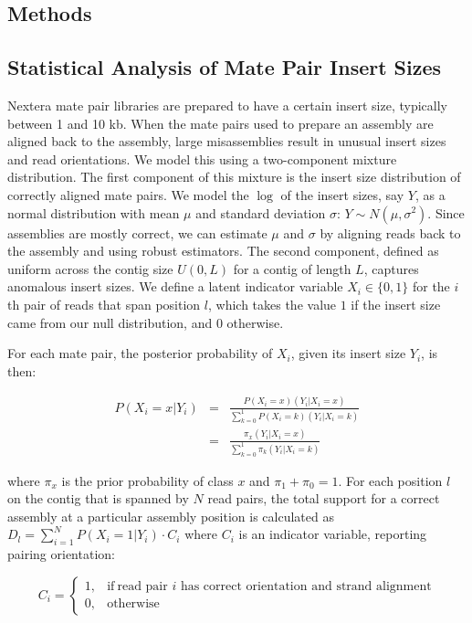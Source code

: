 \documentclass{bioinfo}
\begin{document}
\begin{methods}
\section{Methods}
\subsection{Statistical Analysis of Mate Pair Insert Sizes}
Nextera mate pair libraries are prepared to have a certain insert size, typically between 1 and 10 kb. When the mate pairs used to prepare an assembly are aligned back to the assembly, large misassemblies result in unusual insert sizes and read orientations. We model this using a two-component mixture distribution. The first component of this mixture is the insert size distribution of correctly aligned mate pairs.  We model the $\log$ of the insert sizes, say $Y$, as a normal distribution with mean $\mu$ and standard deviation $\sigma$: $Y \sim N(\mu,\sigma^2).$ Since assemblies are mostly correct, we can estimate $\mu$ and $\sigma$ by aligning reads back to the assembly and using robust estimators. The second component, defined as uniform across the contig size $U(0,L)$ for a contig of length $L$, captures anomalous insert sizes. We define a latent indicator variable $X_i\in\{0,1\}$ for the $i$th pair of reads that span position $l$, which takes the value $1$ if the insert size came from our null distribution, and $0$ otherwise.

For each mate pair, the posterior probability of $X_i$, given its insert size $Y_i$, is then:

\begin{eqnarray} P(X_i=x|Y_i)& =& \frac{P(X_i=x)(Y_i|X_i=x)}{\sum_{k=0}^1P(X_i=k)(Y_i|X_i=k)}\\
  & =& \frac{\pi_x(Y_i|X_i=x)}{\sum_{k=0}^1 \pi_k(Y_i|X_i=k)}
\label{eq:posterior}  
\end{eqnarray}

where $\pi_x$ is the prior probability of class $x$ and $\pi_1 + \pi_0 = 1$. For each position $l$ on the contig that is spanned by $N$ read pairs, the total support for a correct assembly at a particular assembly position is calculated as $D_l = \sum_{i=1}^N P(X_i=1|Y_i)\cdot C_i$ where $C_i$ is an indicator variable, reporting pairing orientation:

\begin{equation}
    C_i=
    \begin{cases}
      1, & \text{if}\ \text{read pair $i$ has correct orientation and strand alignment} \\ 
      0, & \text{otherwise}
    \end{cases}
  \label{eq:C}
  \end{equation}


\end{methods}
\end{document}
